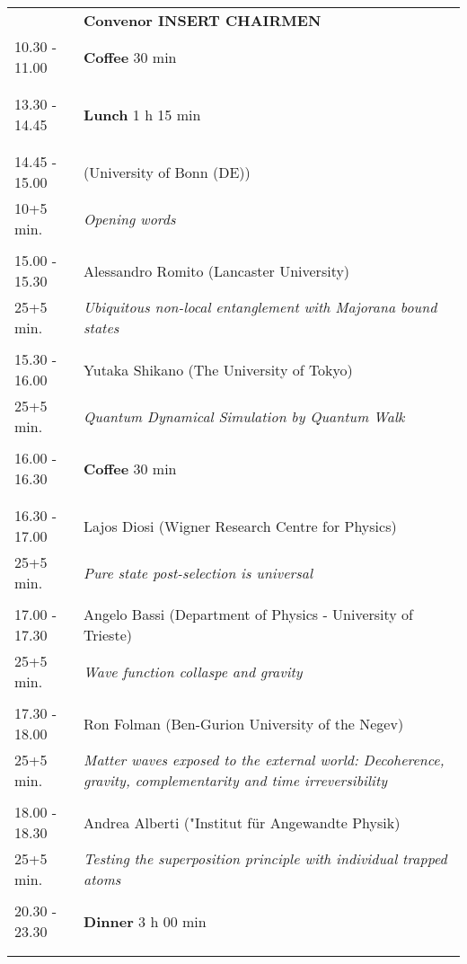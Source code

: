 \begin{longtable}{p{3cm}p{13cm}}
&\hfill {\bf Convenor INSERT CHAIRMEN }\\ 
10.30 - 11.00 & {\bf Coffee} \hfill 30 min \\ 
 & \\ 
 & \\ 
13.30 - 14.45 & {\bf Lunch} \hfill 1 h 15 min \\ 
 & \\ 
 & \\ 
14.45 - 15.00 &  (University of Bonn (DE))\\ 
10+5 min. & {\it Opening words}\\ 
 & \\ 
15.00 - 15.30 & Alessandro Romito (Lancaster University)\\ 
25+5 min. & {\it Ubiquitous non-local entanglement with Majorana bound states}\\ 
 & \\ 
15.30 - 16.00 & Yutaka Shikano (The University of Tokyo)\\ 
25+5 min. & {\it Quantum Dynamical Simulation by Quantum Walk}\\ 
 & \\ 
16.00 - 16.30 & {\bf Coffee} \hfill 30 min \\ 
 & \\ 
 & \\ 
16.30 - 17.00 & Lajos Diosi (Wigner Research Centre for Physics)\\ 
25+5 min. & {\it Pure state post-selection is universal}\\ 
 & \\ 
17.00 - 17.30 & Angelo Bassi (Department of Physics - University of Trieste)\\ 
25+5 min. & {\it Wave function collaspe and gravity}\\ 
 & \\ 
17.30 - 18.00 & Ron Folman (Ben-Gurion University of the Negev)\\ 
25+5 min. & {\it Matter waves exposed to the external world: Decoherence, gravity, complementarity and time irreversibility}\\ 
 & \\ 
18.00 - 18.30 & Andrea Alberti ("Institut für Angewandte Physik)\\ 
25+5 min. & {\it Testing the superposition principle with individual trapped atoms}\\ 
 & \\ 
20.30 - 23.30 & {\bf Dinner} \hfill 3 h 00 min \\ 
 & \\ 
 & \\ 
\end{longtable}

